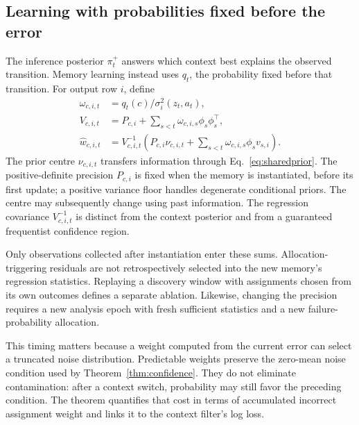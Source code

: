 \subsection{Learning with probabilities fixed before the error}\label{sec:predictableupdates}
The inference posterior $\pi_t^+$ answers which context best explains the observed transition. Memory learning instead uses $q_t$, the probability fixed before that transition. For output row $i$, define
\begin{align}
 \omega_{c,i,t}&=q_t(c)/\sigma_i^2(z_t,a_t),\label{eq:weights}\\
 V_{c,i,t}&=P_{c,i}+\sum_{s<t}\omega_{c,i,s}\phi_s\phi_s^\top,\label{eq:precision}\\
 \widehat w_{c,i,t}&=V_{c,i,t}^{-1}\left(P_{c,i}\nu_{c,i,t}
                  +\sum_{s<t}\omega_{c,i,s}\phi_s v_{s,i}\right).\label{eq:weightedmean}
\end{align}
The prior centre $\nu_{c,i,t}$ transfers information through Eq.~\eqref{eq:sharedprior}. The positive-definite precision $P_{c,i}$ is fixed when the memory is instantiated, before its first update; a positive variance floor handles degenerate conditional priors. The centre may subsequently change using past information. The regression covariance $V_{c,i,t}^{-1}$ is distinct from the context posterior and from a guaranteed frequentist confidence region.

Only observations collected after instantiation enter these sums. Allocation-triggering residuals are not retrospectively selected into the new memory's regression statistics. Replaying a discovery window with assignments chosen from its own outcomes defines a separate ablation. Likewise, changing the precision requires a new analysis epoch with fresh sufficient statistics and a new failure-probability allocation.

This timing matters because a weight computed from the current error can select a truncated noise distribution. Predictable weights preserve the zero-mean noise condition used by Theorem~\ref{thm:confidence}. They do not eliminate contamination: after a context switch, probability may still favor the preceding condition. The theorem quantifies that cost in terms of accumulated incorrect assignment weight and links it to the context filter's log loss.

